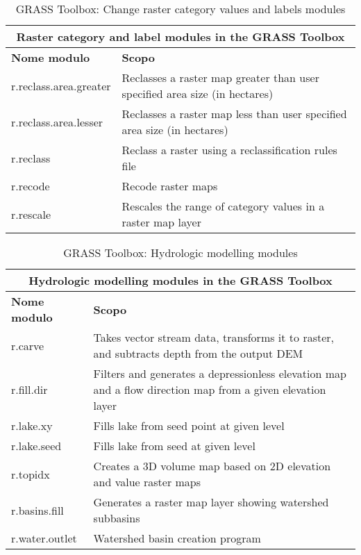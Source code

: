 \begin{table}[ht]
\centering
\caption{GRASS Toolbox: Change raster category values and labels modules}\medskip
 \begin{tabular}{|p{4cm}|p{12cm}|}
  \hline \multicolumn{2}{|c|}{\textbf{Raster category and label modules in the GRASS Toolbox}} \\
  \hline \textbf{Nome modulo} & \textbf{Scopo} \\
  \hline r.reclass.area.greater & Reclasses a raster map greater than user
  specified area size (in hectares) \\
  \hline r.reclass.area.lesser & Reclasses a raster map less than user
  specified area size (in hectares) \\
  \hline r.reclass & Reclass a raster using a reclassification rules file \\
  \hline r.recode & Recode raster maps\\
  \hline r.rescale & Rescales the range of category values in a raster map
  layer \\
\hline
\end{tabular}
\end{table}

\begin{table}[ht]
\centering
\caption{GRASS Toolbox: Hydrologic modelling modules}\medskip
 \begin{tabular}{|p{4cm}|p{12cm}|}
  \hline \multicolumn{2}{|c|}{\textbf{Hydrologic modelling modules in the GRASS
  Toolbox}} \\
  \hline \textbf{Nome modulo} & \textbf{Scopo} \\
  \hline r.carve & Takes vector stream data, transforms it to raster, and
  subtracts depth from the output DEM \\
  \hline r.fill.dir & Filters and generates a depressionless elevation map
  and a flow direction map from a given elevation layer \\
  \hline r.lake.xy & Fills lake from seed point at given level \\
  \hline r.lake.seed & Fills lake from seed at given level \\
  \hline r.topidx & Creates a 3D volume map based on 2D elevation and value
  raster maps \\
  \hline r.basins.fill & Generates a raster map layer showing watershed
  subbasins \\
  \hline r.water.outlet & Watershed basin creation program \\
\hline
\end{tabular}
\end{table}

